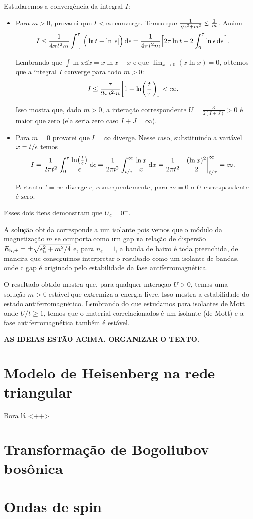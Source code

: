 \documentclass[a4paper,10pt]{article}
\begin{document}
\n

Estudaremos a convergência da integral $I$:
\begin{itemize}
\item Para $m > 0$, provarei que $I < \infty$ converge. Temos que $\frac{1}{\sqrt{\epsilon^2+m^2}} \leq \frac{1}{m}$. Assim:
$$
I \leq \frac{1}{4\pi t^2 m} \int_{-\tau}^{\tau} \Big( \ln t - \ln\abs{\epsilon} \Big) \dd{\epsilon} =
\frac{1}{4\pi t^2 m} \Big[ 2\tau \ln t - 2 \int_{0}^{\tau} \ln\epsilon \dd{\epsilon} \Big] .
$$

Lembrando que $\int \ln x \dd{x} = x \ln x - x$ e que $\displaystyle{\lim_{x\to 0} (x \ln x) = 0}$, obtemos que a integral $I$ converge para todo $m > 0$:
$$
I \leq \frac{\tau}{2\pi t^2 m} \qty[1 + \ln(\frac{t}{\tau})] < \infty.
$$

Isso mostra que, dado $m > 0$, a interação correspondente $U = \frac{3}{2(I+J)} > 0$ é maior que zero (ela seria zero caso $I + J = \infty$).

\item Para $m = 0$ provarei que $I = \infty$ diverge. Nesse caso, substituindo a variável $x = t/\epsilon$ temos
$$
I = \frac{1}{2\pi t^2} \int_{0}^{\tau} \frac{\ln(\frac{t}{\eps})}{\eps} \dd{\eps} =
\frac{1}{2\pi t^2}
\int_{t/\tau}^{\infty} \frac{\ln x}{x} \dd{x} =
\frac{1}{2\pi t^2} \cdot \eval{\frac{(\ln x)^2}{2}}_{t/\tau}^{\infty} = \infty.
$$

Portanto $I = \infty$ diverge e, consequentemente, para $m = 0$ o $U$ correspondente é zero.
\end{itemize}

Esses dois itens demonstram que $U_c = 0^+$.

A solução obtida corresponde a um isolante pois vemos que o módulo da magnetização $m$ se comporta como um gap na relação de dispersão $E_{\vb{k},\pm} = \pm \sqrt{\epsilon_{\vb{k}}^2 + m^2/4}$ e, para $n_e = 1$, a banda de baixo é toda preenchida, de maneira que conseguimos interpretar o resultado como um isolante de bandas, onde o gap é originado pelo estabilidade da fase antiferromagnética.

O resultado obtido mostra que, para qualquer interação $U > 0$, temos uma solução $m > 0$ estável que extremiza a energia livre. Isso mostra a estabilidade do estado antiferromagnético. Lembrando do que estudamos para isolantes de Mott onde $U/t \geq 1$, temos que o material correlacionados é um isolante (de Mott) e a fase antiferromagnética também é estável.

\textbf{AS IDEIAS ESTÃO ACIMA. ORGANIZAR O TEXTO.}



\pagebreak

\section{Modelo de Heisenberg na rede triangular}

Bora lá
<++>



\pagebreak

\section{Transformação de Bogoliubov bosônica}



\pagebreak

\section{Ondas de spin}
\end{document}

